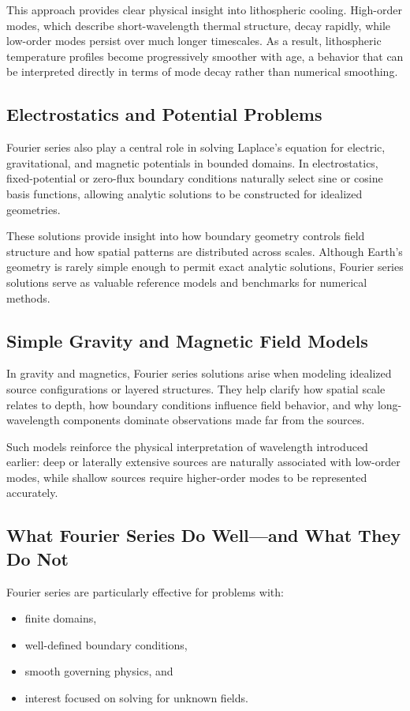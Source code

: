This approach provides clear physical insight into lithospheric cooling. High-order modes, which describe short-wavelength thermal structure, decay rapidly, while low-order modes persist over much longer timescales. As a result, lithospheric temperature profiles become progressively smoother with age, a behavior that can be interpreted directly in terms of mode decay rather than numerical smoothing.

\subsection{Electrostatics and Potential Problems}

Fourier series also play a central role in solving Laplace's equation for electric, gravitational, and magnetic potentials in bounded domains. In electrostatics, fixed-potential or zero-flux boundary conditions naturally select sine or cosine basis functions, allowing analytic solutions to be constructed for idealized geometries.

These solutions provide insight into how boundary geometry controls field structure and how spatial patterns are distributed across scales. Although Earth's geometry is rarely simple enough to permit exact analytic solutions, Fourier series solutions serve as valuable reference models and benchmarks for numerical methods.

\subsection{Simple Gravity and Magnetic Field Models}

In gravity and magnetics, Fourier series solutions arise when modeling idealized source configurations or layered structures. They help clarify how spatial scale relates to depth, how boundary conditions influence field behavior, and why long-wavelength components dominate observations made far from the sources.

Such models reinforce the physical interpretation of wavelength introduced earlier: deep or laterally extensive sources are naturally associated with low-order modes, while shallow sources require higher-order modes to be represented accurately.

\subsection{What Fourier Series Do Well—and What They Do Not}

Fourier series are particularly effective for problems with:
\begin{itemize}
    \item finite domains,
    \item well-defined boundary conditions,
    \item smooth governing physics, and
    \item interest focused on solving for unknown fields.
\end{itemize}

